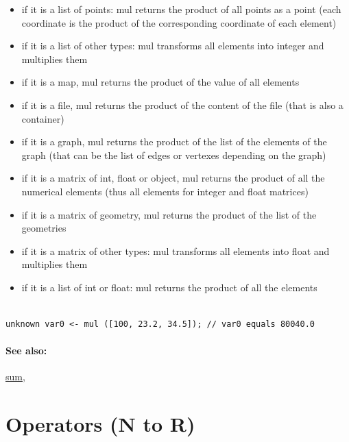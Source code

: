 \documentclass[]{book}
\providecommand{\tightlist}{%
  \setlength{\itemsep}{0pt}\setlength{\parskip}{0pt}}
\theoremstyle{definition}
\theoremstyle{definition}
\theoremstyle{definition}
\theoremstyle{remark}
\begin{document}
\begin{itemize}
\tightlist
\item
  if it is a list of points: mul returns the product of all points as a
  point (each coordinate is the product of the corresponding coordinate
  of each element)\\
\item
  if it is a list of other types: mul transforms all elements into
  integer and multiplies them\\
\item
  if it is a map, mul returns the product of the value of all elements\\
\item
  if it is a file, mul returns the product of the content of the file
  (that is also a container)\\
\item
  if it is a graph, mul returns the product of the list of the elements
  of the graph (that can be the list of edges or vertexes depending on
  the graph)\\
\item
  if it is a matrix of int, float or object, mul returns the product of
  all the numerical elements (thus all elements for integer and float
  matrices)\\
\item
  if it is a matrix of geometry, mul returns the product of the list of
  the geometries\\
\item
  if it is a matrix of other types: mul transforms all elements into
  float and multiplies them\\
\item
  if it is a list of int or float: mul returns the product of all the
  elements
\end{itemize}

\begin{verbatim}
 
unknown var0 <- mul ([100, 23.2, 34.5]); // var0 equals 80040.0
\end{verbatim}

\subsubsection{See also:}\label{see-also-144}

\href{operators-s-to-z.html\#sum}{sum},

\chapter{Operators (N to R)}\label{operators-n-to-r}
\end{document}
